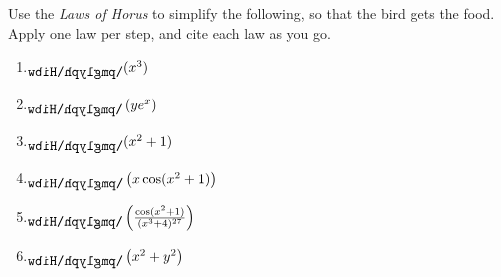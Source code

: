 \documentclass[10pt]{report}
\begin{document}
Use the {\em Laws of Horus} to simplify the following, so that the bird gets the food.  Apply one law per step, and cite each law as you go.
\begin{multicols}{2}
  \begin{enumerate}[{\bf 1.}]
\item $\d(x^3)$
  \vspace{.5cm}
\item $\d\left(ye^x\right)$
  \vspace{.5cm}
\item 
  $\d (x^2 + 1)$
  \vspace{.5cm}
\item
  $\d \left(x\cos(x^2+1)\right)$
  \vspace{.5cm}
\item
  $\d \left(\frac{\cos(x^2+1)}{(x^3+4)^{27}}\right)$
\item
  $\d \left(x^2+y^2\right)$
\end{enumerate}
\end{multicols}
\end{document}
